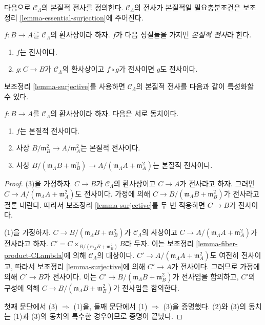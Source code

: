 \noindent
다음으로 $\mathcal{C}_\Lambda$의 본질적 전사를 정의한다.
$\mathcal{C}_\Lambda$의 전사가 본질적일 필요충분조건은 보조정리
\ref{lemma-essential-surjection}에 주어진다.

\begin{definition}
\label{definition-essential-surjection}
$f: B \to A$를 $\mathcal{C}_\Lambda$의 환사상이라 하자. $f$가 다음 성질들을
가지면 {\it 본질적 전사}라 한다.
\begin{enumerate}
\item $f$는 전사이다.
\item $g: C \to B$가 $\mathcal{C}_\Lambda$의 환사상이고
$f \circ g$가 전사이면 $g$도 전사이다.
\end{enumerate}
\end{definition}

\noindent
보조정리 \ref{lemma-surjective}를 사용하면 $\mathcal{C}_\Lambda$의
본질적 전사를 다음과 같이 특성화할 수 있다.

\begin{lemma}
\label{lemma-essential-surjection-mod-squares}
$f: B \to A$를 $\mathcal{C}_\Lambda$의 환사상이라 하자.
다음은 서로 동치이다.
\begin{enumerate}
\item $f$는 본질적 전사이다.
\item 사상 $B/\mathfrak m_B^2 \to A/\mathfrak m_A^2$는 본질적 전사이다.
\item 사상
$B/(\mathfrak m_\Lambda B + \mathfrak m_B^2) \to
A/(\mathfrak m_\Lambda A + \mathfrak m_A^2)$는 본질적 전사이다.
\end{enumerate}
\end{lemma}

\begin{proof}
(3)을 가정하자. $C \to B$가 $\mathcal{C}_\Lambda$의 환사상이고
$C \to A$가 전사라고 하자. 그러면
$C \to A/(\mathfrak m_\Lambda A + \mathfrak m_A^2)$도 전사이다.
가정에 의해 $C \to B/(\mathfrak m_\Lambda B + \mathfrak m_B^2)$가
전사라고 결론 내린다. 따라서 보조정리 \ref{lemma-surjective}를 두 번
적용하면 $C \to B$가 전사이다.

\medskip\noindent
(1)을 가정하자. $C \to B/(\mathfrak m_\Lambda B + \mathfrak m_B^2)$가
$\mathcal{C}_\Lambda$의 사상이고
$C \to A/(\mathfrak m_\Lambda A + \mathfrak m_A^2)$가 전사라고 하자.
$C' = C \times_{B/(\mathfrak m_\Lambda B + \mathfrak m_B^2)} B$라 두자.
이는 보조정리 \ref{lemma-fiber-product-CLambda}에 의해
$\mathcal{C}_\Lambda$의 대상이다.
$C' \to A/(\mathfrak m_\Lambda A + \mathfrak m_A^2)$도 여전히
전사이고, 따라서 보조정리 \ref{lemma-surjective}에 의해
$C' \to A$가 전사이다. 그러므로 가정에 의해 $C' \to B$가 전사이다.
이는 $C' \to B/(\mathfrak m_\Lambda B + \mathfrak m_B^2)$가 전사임을
함의하고, $C'$의 구성에 의해
$C \to B/(\mathfrak m_\Lambda B + \mathfrak m_B^2)$가 전사임을 함의한다.

\medskip\noindent
첫째 문단에서 (3) $\Rightarrow$ (1)을, 둘째 문단에서
(1) $\Rightarrow$ (3)을 증명했다. (2)와 (3)의 동치는 (1)과 (3)의
동치의 특수한 경우이므로 증명이 끝났다.
\end{proof}

